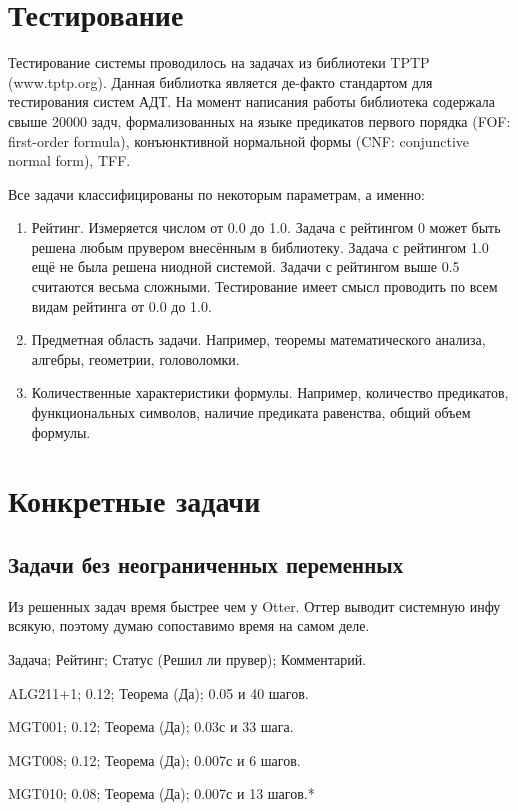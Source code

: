 \section{Тестирование}

Тестирование системы проводилось на задачах из библиотеки TPTP (www.tptp.org). Данная библиотка является де-факто стандартом для тестирования систем АДТ. На момент написания работы библиотека содержала свыше 20000 задч, формализованных на языке предикатов первого порядка (FOF: first-order formula), конъюнктивной нормальной формы (CNF: conjunctive normal form), TFF.

Все задачи классифицированы по некоторым параметрам, а именно:
\begin{enumerate}
\item Рейтинг. Измеряется числом от 0.0 до 1.0. Задача с рейтингом 0 может быть решена любым прувером внесённым в библиотеку. Задача с рейтингом 1.0 ещё не была решена ниодной системой. Задачи с рейтингом выше 0.5 считаются весьма сложными. Тестирование имеет смысл проводить по всем видам рейтинга от 0.0 до 1.0.
\item Предметная область задачи. Например, теоремы математического анализа, алгебры, геометрии, головоломки.
\item Количественные характеристики формулы. Например, количество предикатов, функциональных символов, наличие предиката равенства, общий объем формулы.
\end{enumerate}



\section{Конкретные задачи}

\subsection{Задачи без неограниченных переменных}
Из решенных задач время быстрее чем у Otter. Оттер выводит системную инфу всякую, поэтому думаю сопоставимо время на самом деле.

Задача; Рейтинг; Статус (Решил ли прувер); Комментарий.

ALG211+1; 0.12; Теорема (Да); 0.05 и 40 шагов.

MGT001; 0.12; Теорема (Да); 0.03с и 33 шага.

MGT008; 0.12; Теорема (Да); 0.007с и 6 шагов.

MGT010; 0.08; Теорема (Да); 0.007с и 13 шагов.*

